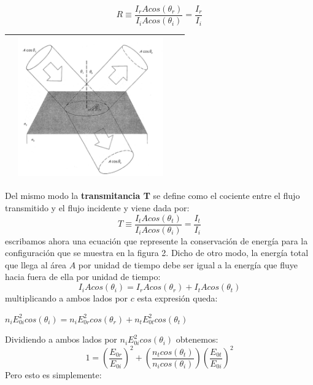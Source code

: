 \documentclass[12]{article}
\newenvironment{Figure}
{\par\medskip\noindent\minipage{\linewidth}}
{\endminipage\par\medskip}
\begin{document}
\begin{multicols}{2}
\begin{equation}
R \equiv \frac{I_{r}A cos(\theta_{r})}{I_{i}A cos(\theta_{i})} = \frac{I_{r}}{I_{i}}
\end{equation} 
\begin{Figure}	
\center
\begin{tabular}{|l|r|}
\hline
\includegraphics[width=7cm, height=6cm]{img/reflexate.png} \\ \hline
\end{tabular}
\label{fig:g2}
\end{Figure}
Del mismo modo la \textbf{transmitancia T} se define como el cociente entre el flujo transmitido y el flujo incidente y viene dada por:
\begin{equation}
T \equiv \frac{I_{t}A cos(\theta_{t})}{I_{i}A cos(\theta_{i})} = \frac{I_{t}}{I_{i}}
\end{equation}
escribamos ahora una ecuación que represente la conservación de energía para la configuración que se muestra en la figura 2. Dicho de otro modo, la energía total que llega al área  $A$ por unidad de tiempo debe ser igual a la energía que fluye hacia fuera de ella por unidad de tiempo:
\begin{equation}
I_{i} A cos(\theta_{i}) = I_{r} A cos(\theta_{r}) + I_{t} A cos(\theta_{t}) 
\end{equation}
multiplicando a ambos lados por $c$ esta expresión queda: 
\begin{center}
$ n_{i} E_{0i}^{2}cos(\theta_{i}) =  n_{i} E_{0r}^{2}cos(\theta_{r}) +  n_{t} E_{0t}^{2}cos(\theta_{t})$
\end{center}
Dividiendo a ambos lados por $ n_{i} E_{0i}^{2}cos(\theta_{i})$ obtenemos:
\begin{equation}
1 = \left ( \frac{E_{0r}}{E_{0i}} \right) ^{2} + \left ( \frac{n_{t}cos(\theta_{t})}{n_{i}cos(\theta_{i})} \right ) \left ( \frac{E_{0t}}{E_{0i}} \right) ^{2}
\end{equation}
Pero esto es simplemente:

\end{multicols}
\end{document}
